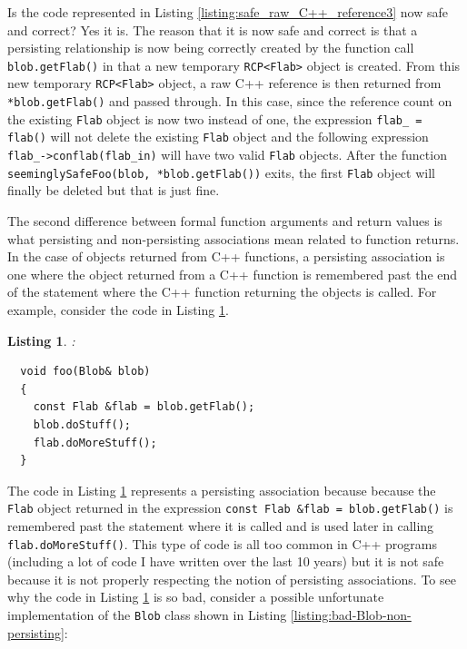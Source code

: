 \documentclass[pdf,ps2pdf,11pt]{SANDreport}
\newtheorem{listing}{Listing}
\begin{document}
Is the code represented in Listing
{}\ref{listing:safe_raw_C++_reference3} now safe and correct?  Yes it
is.  The reason that it is now safe and correct is that a persisting
relationship is now being correctly created by the function call
{}\texttt{blob.getFlab()} in that a new temporary {}\texttt{RCP<Flab>}
object is created.  From this new temporary {}\texttt{RCP<Flab>}
object, a raw C++ reference is then returned from
{}\texttt{*blob.getFlab()} and passed through.  In this case, since
the reference count on the existing {}\texttt{Flab} object is now two
instead of one, the expression {}\texttt{flab\_ = flab()} will not
delete the existing {}\texttt{Flab} object and the following
expression {}\texttt{flab\_->conflab(flab\_in)} will have two valid
{}\texttt{Flab} objects.  After the function
{}\texttt{seeminglySafeFoo(blob, *blob.getFlab())} exits, the first
{}\texttt{Flab} object will finally be deleted but that is just fine.

The second difference between formal function arguments and return
values is what persisting and non-persisting associations mean related
to function returns.  In the case of objects returned from C++
functions, a persisting association is one where the object returned
from a C++ function is remembered past the end of the statement where
the C++ function returning the objects is called.  For example,
consider the code in Listing {}\ref{listing:persisting-func-return-1}.

\begin{listing}:\\
\label{listing:persisting-func-return-1}
{\small\begin{verbatim}
  void foo(Blob& blob)
  {
    const Flab &flab = blob.getFlab();
    blob.doStuff();
    flab.doMoreStuff();
  }
\end{verbatim}}
\end{listing}

The code in Listing {}\ref{listing:persisting-func-return-1}
represents a persisting association because because the
{}\texttt{Flab} object returned in the expression {}\texttt{const Flab
\&flab = blob.getFlab()} is remembered past the statement where it is
called and is used later in calling {}\texttt{flab.doMoreStuff()}.
This type of code is all too common in C++ programs (including a lot
of code I have written over the last 10 years) but it is not safe
because it is not properly respecting the notion of persisting
associations.  To see why the code in Listing
{}\ref{listing:persisting-func-return-1} is so bad, consider a
possible unfortunate implementation of the {}\texttt{Blob} class shown
in Listing {}\ref{listing:bad-Blob-non-persisting}:
\end{document}
